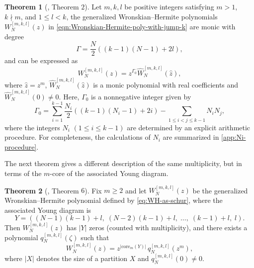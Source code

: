\documentclass[preprint,3p,10pt]{elsarticle}
\theoremstyle{definition}
\newtheorem{theorem}{Theorem}[section]
\begin{document}
\begin{theorem}[\cite{lin2024rogue}, Theorem $2$]\label{lemma:root structure of WH polynomials}
Let \(m,k,l\) be positive integers satisfying $m > 1$, $k \nmid m$, and $1 \leq l < k$, the generalized Wronskian--Hermite polynomials $W_N^{[m,k,l]}(z)$ in \eqref{eqn:Wronskian-Hermite-poly-with-jump-k} are monic with degree
\begin{equation} \label{degree Gamma}
    \Gamma = \frac{N}{2} \left( (k - 1)(N - 1) + 2l \right),
\end{equation}
and can be expressed as
\begin{equation} \label{W_N structure}
    W_N^{[m,k,l]}(z) = z^{\Gamma_0} \widehat{W}_N^{[m,k,l]}(\hat{z}),
\end{equation}
where $\hat{z} = z^m$, $\widehat{W}_N^{[m,k,l]}(\hat{z})$ is a monic polynomial with real coefficients and $\widehat{W}_N^{[m,k,l]}(0)\neq0$. Here, $\Gamma_0$ is a nonnegative integer given by
\begin{equation} \label{Gamma_0 formula}
    \Gamma_0 = \sum_{i=1}^{k-1} \frac{N_i}{2} \left( (k - 1)(N_i - 1) + 2i \right) - \sum_{1 \leq i < j \leq k-1} N_i N_j,
\end{equation}
where the integers $N_i$ $(1\le i\le k-1)$ are determined by an explicit arithmetic procedure.
For completeness, the calculations of $N_i$ are summarized in \ref{app:Ni-procedure}.
\end{theorem}

The next theorem gives a different description
of the same multiplicity, but in terms of the \(m\)-core of the associated Young diagram.




\begin{theorem}[\cite{bonneux2020coefficients}, Theorem $6$]\label{thm:WH-mcore-factorization}
Fix $m\ge2$ and let $W_N^{[m,k,l]}(z)$ be the generalized Wronskian--Hermite polynomial defined by
\eqref{eq:WH-as-schur}, where the associated Young diagram is
\begin{equation}\label{eq:WH-young-diagram-repeat}
Y=\left((N-1)(k-1)+l,\; (N-2)(k-1)+l,\; \ldots,\; (k-1)+l,\; l\right).
\end{equation}
Then $W_N^{[m,k,l]}(z)$ has $|Y|$ zeros (counted with multiplicity), and there exists a polynomial $q_N^{[m,k,l]}(\zeta)$ such that
\begin{equation}\label{eq:WH-mcore-factorization}
W_N^{[m,k,l]}(z)=z^{|\mathrm{core}_m(Y)|}\,q_N^{[m,k,l]}(z^m),
\end{equation}
where $|X|$ denotes the size of a partition $X$ and $q_N^{[m,k,l]}(0)\neq0$.
\end{theorem}
\end{document}
